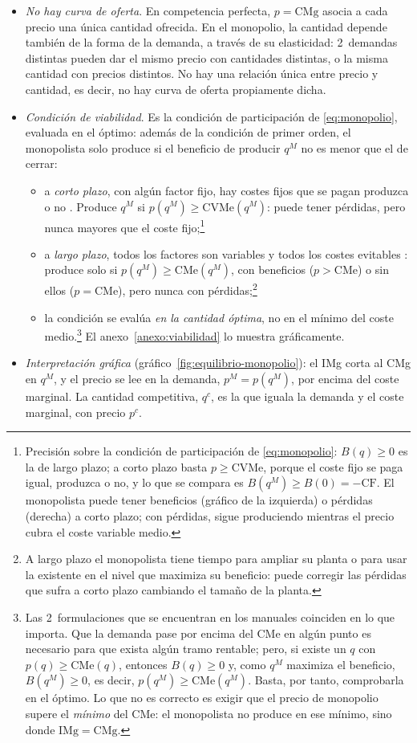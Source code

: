 \documentclass[11pt]{article}
\begin{document}
\begin{itemize}
\item \emph{No hay curva de oferta}. En competencia perfecta, $p=\mathrm{CMg}$ asocia a cada precio una única cantidad ofrecida. En el monopolio, la cantidad depende también de la forma de la demanda, a través de su elasticidad: 2~demandas distintas pueden dar el mismo precio con cantidades distintas, o la misma cantidad con precios distintos. No hay una relación única entre precio y cantidad, es decir, no hay curva de oferta propiamente dicha.
\item \emph{Condición de viabilidad}. Es la condición de participación de \eqref{eq:monopolio}, evaluada en el óptimo: además de la condición de primer orden, el monopolista solo produce si el beneficio de producir $q^M$ no es menor que el de cerrar:
  \begin{itemize}
  \item a \emph{corto plazo}, con algún factor fijo, hay costes fijos que se pagan produzca o no . Produce $q^M$ si $p(q^M)\geq\mathrm{CVMe}(q^M)$: puede tener pérdidas, pero nunca mayores que el coste fijo;\footnote{Precisión sobre la condición de participación de \eqref{eq:monopolio}: $B(q)\geq 0$ es la de largo plazo; a corto plazo basta $p\geq\mathrm{CVMe}$, porque el coste fijo se paga igual, produzca o no, y lo que se compara es $B(q^M)\geq B(0)=-\mathrm{CF}$. El monopolista puede tener beneficios (gráfico de la izquierda) o pérdidas (derecha) a corto plazo; con pérdidas, sigue produciendo mientras el precio cubra el coste variable medio.}
  \item a \emph{largo plazo}, todos los factores son variables y todos los costes evitables : produce solo si $p(q^M)\geq\mathrm{CMe}(q^M)$, con beneficios ($p>\mathrm{CMe}$) o sin ellos ($p=\mathrm{CMe}$), pero nunca con pérdidas;\footnote{A largo plazo el monopolista tiene tiempo para ampliar su planta o para usar la existente en el nivel que maximiza su beneficio: puede corregir las pérdidas que sufra a corto plazo cambiando el tamaño de la planta.}
  \item la condición se evalúa \emph{en la cantidad óptima}, no en el mínimo del coste medio.\footnote{Las 2~formulaciones que se encuentran en los manuales coinciden en lo que importa. Que la demanda pase por encima del CMe en algún punto es necesario para que exista algún tramo rentable; pero, si existe un $q$ con $p(q)\geq\mathrm{CMe}(q)$, entonces $B(q)\geq 0$ y, como $q^M$ maximiza el beneficio, $B(q^M)\geq 0$, es decir, $p(q^M)\geq\mathrm{CMe}(q^M)$. Basta, por tanto, comprobarla en el óptimo. Lo que no es correcto es exigir que el precio de monopolio supere el \emph{mínimo} del CMe: el monopolista no produce en ese mínimo, sino donde $\mathrm{IMg}=\mathrm{CMg}$.} El anexo~\ref{anexo:viabilidad} lo muestra gráficamente.
  \end{itemize}
\item \emph{Interpretación gráfica} (gráfico~\ref{fig:equilibrio-monopolio}): el IMg corta al CMg en $q^M$, y el precio se lee en la demanda, $p^M=p(q^M)$, por encima del coste marginal. La cantidad competitiva, $q^c$, es la que iguala la demanda y el coste marginal, con precio $p^c$.
\end{itemize}
\end{document}
